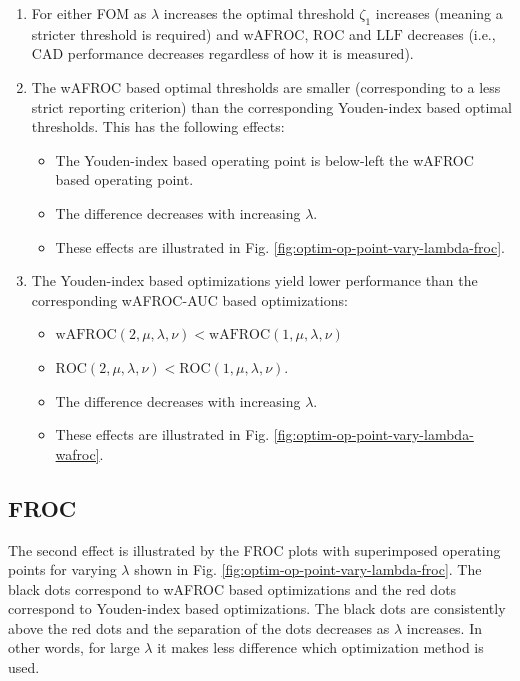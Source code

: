 \documentclass[
]{book}
\providecommand{\tightlist}{%
  \setlength{\itemsep}{0pt}\setlength{\parskip}{0pt}}
\begin{document}
\begin{enumerate}
\def\labelenumi{\arabic{enumi}.}
\item
  For either FOM as \(\lambda\) increases the optimal threshold \(\zeta_{1}\) increases (meaning a stricter threshold is required) and \(\text{wAFROC}\), \(\text{ROC}\) and \(\text{LLF}\) decreases (i.e., CAD performance decreases regardless of how it is measured).
\item
  The wAFROC based optimal thresholds are smaller (corresponding to a less strict reporting criterion) than the corresponding Youden-index based optimal thresholds. This has the following effects:

  \begin{itemize}
  \tightlist
  \item
    The Youden-index based operating point is below-left the wAFROC based operating point.
  \item
    The difference decreases with increasing \(\lambda\).
  \item
    These effects are illustrated in Fig. \ref{fig:optim-op-point-vary-lambda-froc}.
  \end{itemize}
\item
  The Youden-index based optimizations yield lower performance than the corresponding wAFROC-AUC based optimizations:

  \begin{itemize}
  \tightlist
  \item
    \(\text{wAFROC} \left (2, \mu, \lambda, \nu \right ) < \text{wAFROC} \left (1, \mu, \lambda, \nu \right )\)
  \item
    \(\text{ROC} \left (2, \mu, \lambda, \nu \right ) < \text{ROC} \left (1, \mu, \lambda, \nu \right )\).
  \item
    The difference decreases with increasing \(\lambda\).
  \item
    These effects are illustrated in Fig. \ref{fig:optim-op-point-vary-lambda-wafroc}.
  \end{itemize}
\end{enumerate}

\hypertarget{froc-1}{%
\subsection{FROC}\label{froc-1}}

The second effect is illustrated by the FROC plots with superimposed operating points for varying \(\lambda\) shown in Fig. \ref{fig:optim-op-point-vary-lambda-froc}. The black dots correspond to wAFROC based optimizations and the red dots correspond to Youden-index based optimizations. The black dots are consistently above the red dots and the separation of the dots decreases as \(\lambda\) increases. In other words, for large \(\lambda\) it makes less difference which optimization method is used.
\end{document}
